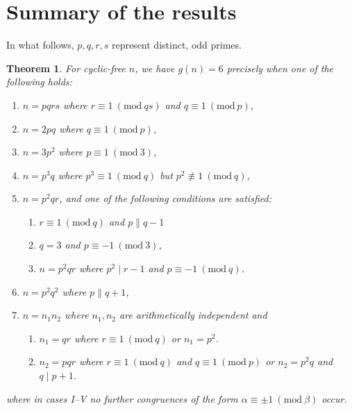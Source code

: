 \documentclass{article}
\newcommand{\Mod}[1]{\ (\mathrm{mod} \ #1)}
\theoremstyle{plain}
\newtheorem{thm}{Theorem}[section]
\theoremstyle{definition}
\begin{document}
\section{Summary of the results}
In what follows, $p, q, r, s$ represent distinct, odd primes.
\nopagebreak
{}
\begin{thm}
	For cyclic-free $n$, we have $g(n) = 6$ precisely when one of the following holds:
	\begin{enumerate} \listspace
		\item $n = pqrs$ where $r \equiv 1 \Mod{qs}$ and $q \equiv 1 \Mod{p}$,
		\item $n = 2pq$ where $q \equiv 1 \Mod{p}$,
		\item $n = 3p^2$ where $p \equiv 1 \Mod{3}$,
		\item $n = p^3 q$ where $p^3 \equiv 1 \Mod{q}$ but $p^2 \not\equiv 1 \Mod{q}$,
		\item $n = p^2 q r$, and one of the following conditions are satisfied:
		\begin{enumerate}
			\item $r \equiv 1 \Mod{q}$ and $p \parallel q - 1$ 
			\item $q = 3$ and $p \equiv -1 \Mod{3}$,
			\item $n = p^2 q r$ where $p^2 \mid r - 1$ and $p \equiv -1 \Mod{q}$.
		\end{enumerate}
		\item $n = p^2 q^2$ where $p \parallel q + 1$,
		\item $n = n_1 n_2$ where $n_1, n_2$ are arithmetically independent and
		\begin{enumerate}
			\item $n_1 = qr$ where $r \equiv 1 \Mod{q}$ or $n_1 = p^2$.
			\item $n_2 = pqr$ where $r \equiv 1 \Mod{q}$ and $q \equiv 1 \Mod{p}$ or $n_2 = p^2 q$ and $q \mid p + 1$.
		\end{enumerate}
	\end{enumerate} \textspace
	where in cases I--V no further congruences of the form $\alpha \equiv \pm 1 \Mod{\beta}$ \nolinebreak[4] \mbox{occur}.
\end{thm}
\end{document}
